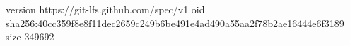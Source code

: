 version https://git-lfs.github.com/spec/v1
oid sha256:40cc359f8e8f11dec2659c249b6be491e4ad490a55aa2f78b2ae16444e6f3189
size 349692
